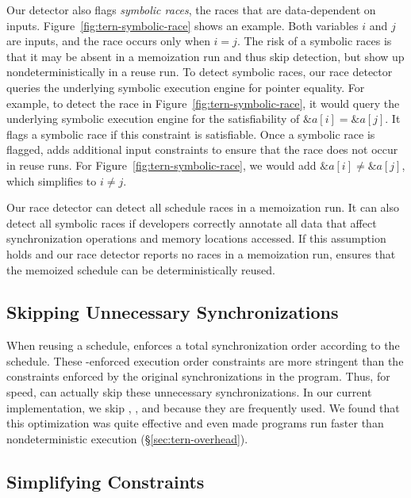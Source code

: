 Our detector also flags \emph{symbolic races}, the races that are
data-dependent on inputs.  Figure~\ref{fig:tern-symbolic-race} shows an example.
Both variables $i$ and $j$ are inputs, and the race occurs only when $i =
j$.  The risk of a symbolic races is that it may be absent in a
memoization run and thus skip detection, but show up nondeterministically
in a reuse run.  To detect symbolic races, our race detector queries the
underlying symbolic execution engine for pointer equality.  For example,
to detect the race in Figure~\ref{fig:tern-symbolic-race}, it would query the
underlying symbolic execution engine for the satisfiability of
$\&a[i]=\&a[j]$.  It flags a symbolic race if this constraint is satisfiable.
Once a symbolic race is flagged, \tern adds additional input constraints to
ensure that the race does not occur in reuse runs.  For
Figure~\ref{fig:tern-symbolic-race}, we would add $\&a[i]\neq \&a[j]$, which
simplifies to $i\neq j$.

Our race detector can detect all schedule races in a memoization run.  It
can also detect all symbolic races if developers correctly annotate all
data that affect synchronization operations and memory locations accessed.
If this assumption holds and our race detector reports no races in a
memoization run, \tern ensures that the memoized schedule can be
deterministically reused.


\subsection{Skipping Unnecessary Synchronizations}  \label{sec:tern-skip-waits}

When reusing a schedule, \tern enforces a total synchronization order
according to the schedule.  These \tern-enforced execution order constraints
are more stringent than the constraints enforced by the original
synchronizations in the program.  Thus, for speed, \tern can actually skip
these unnecessary synchronizations.  In our current implementation, we
skip , , and 
because they are frequently used.  We
found that this optimization was quite effective and
even made programs run faster than nondeterministic execution
(\S\ref{sec:tern-overhead}).

\subsection{Simplifying Constraints} \label{sec:tern-simplify}

